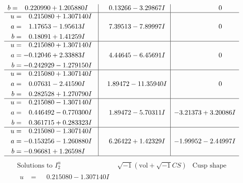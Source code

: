\documentclass[1p]{elsarticle_modified}
\theoremstyle{definition}
\newcommand{\I}{\sqrt{-1}}
\begin{document}
$$\begin{array}{c|c|c}
\begin{aligned}
b &= \phantom{-}0.220990 + 1.205880 I\end{aligned}
 & \phantom{-}0.13266 - 3.29867 I & \phantom{-0.000000 } 0 \\ \hline\begin{aligned}
u &= \phantom{-}0.215080 + 1.307140 I \\
a &= \phantom{-}1.17653 - 1.95613 I \\
b &= \phantom{-}0.18091 + 1.41259 I\end{aligned}
 & \phantom{-}7.39513 - 7.89997 I & \phantom{-0.000000 } 0 \\ \hline\begin{aligned}
u &= \phantom{-}0.215080 + 1.307140 I \\
a &= -0.12046 + 2.33883 I \\
b &= -0.242929 - 1.279150 I\end{aligned}
 & \phantom{-}4.44645 - 6.45691 I & \phantom{-0.000000 } 0 \\ \hline\begin{aligned}
u &= \phantom{-}0.215080 + 1.307140 I \\
a &= \phantom{-}0.07631 - 2.41590 I \\
b &= \phantom{-}0.282528 + 1.270790 I\end{aligned}
 & \phantom{-}1.89472 - 11.35940 I & \phantom{-0.000000 } 0 \\ \hline\begin{aligned}
u &= \phantom{-}0.215080 - 1.307140 I \\
a &= \phantom{-}0.446492 - 0.770300 I \\
b &= \phantom{-}0.361715 + 0.283323 I\end{aligned}
 & \phantom{-}1.89472 - 5.70311 I & -3.21373 + 3.20086 I \\ \hline\begin{aligned}
u &= \phantom{-}0.215080 - 1.307140 I \\
a &= -0.153256 - 1.260880 I \\
b &= -0.96681 + 1.26598 I\end{aligned}
 & \phantom{-}6.26422 + 1.42329 I & -1.99952 - 2.44997 I\\
 \hline 
 \end{array}$$\newpage$$\begin{array}{c|c|c}  
\text{Solutions to }I^u_{2}& \I (\text{vol} + \sqrt{-1}CS) & \text{Cusp shape}\\
 \hline 
\begin{aligned}
u &= \phantom{-}0.215080 - 1.307140 I \\

\end{aligned}
\end{array}$$
\end{document}
